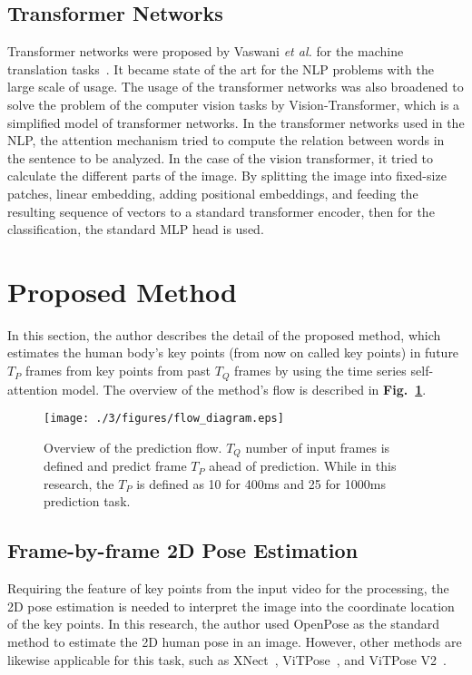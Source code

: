 \subsection{Transformer Networks}
Transformer networks were proposed by Vaswani {\it et al.} for the machine translation tasks~\cite{vaswani2017}. It became state of the art for the NLP problems with the large scale of usage. The usage of the transformer networks was also broadened to solve the problem of the computer vision tasks by Vision-Transformer, which is a simplified model of transformer networks.
In the transformer networks used in the NLP, the attention mechanism tried to compute the relation between words in the sentence to be analyzed.
In the case of the vision transformer, it tried to calculate the different parts of the image.
By splitting the image into fixed-size patches,
linear embedding, adding positional embeddings, and feeding the resulting sequence of vectors to a standard transformer encoder,
then for the classification, the standard MLP head is used.

\section{Proposed Method}
In this section, the author describes the detail of the proposed method, which estimates the human body's key points (from now on called key points) in future $T_{P}$ frames from key points from past $T_{Q}$ frames by using the time series self-attention model. The overview of the method's flow is described in \textbf{Fig.~\ref{fig:methodsoverview}}.

\begin{figure}
    \centering
    \texttt{[image: ./3/figures/flow\_diagram.eps]}
    \caption{Overview of the prediction flow. $T_Q$ number of input frames is defined and predict frame $T_P$ ahead of prediction. While in this research, the $T_P$ is defined as 10 for 400ms and 25 for 1000ms prediction task. }
    \label{fig:methodsoverview}
\end{figure} 


\subsection{Frame-by-frame 2D Pose Estimation}
Requiring the feature of key points from the input video for the processing, the 2D pose estimation is needed to interpret the image into the coordinate location of the key points.
In this research, the author used OpenPose as the standard method to estimate the 2D human pose in an image.
However, other methods are likewise applicable for this task, such as XNect~\cite{XNect}, ViTPose~\cite{vitae}, and ViTPose V2~\cite{vitaev2}.

